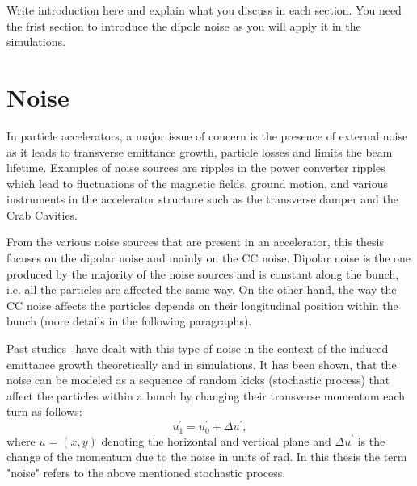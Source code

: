 Write introduction here and explain what you discuss in each section.
You need the frist section to introduce the dipole noise as you will apply it in the simulations.
\section{Noise}\label{sec:noise_definition}
In particle accelerators, a major issue of concern is the presence of external noise as it leads to transverse emittance growth, particle losses and limits the beam lifetime. Examples of noise sources are ripples in the power converter ripples which lead to fluctuations of the magnetic fields, ground motion, and various instruments in the accelerator structure such as the transverse damper and the Crab Cavities. %

From the various noise sources that are present in an accelerator, this thesis focuses on the dipolar noise and mainly on the CC noise. Dipolar noise is the one produced by the majority of the noise sources and is constant along the bunch, i.e. all the particles are affected the same way. %
On the other hand, the way the CC noise affects the particles depends on their longitudinal position within the bunch (more details in the following paragraphs).

Past studies~\cite{Lebedev:248620, Lebedev:248622, PhysRevSTAB.18.101001} have dealt with this type of noise in the context of the induced emittance growth theoretically and in simulations. It has been shown, that the noise can be modeled as a sequence of random kicks (stochastic process) that affect the particles within a bunch by changing their transverse momentum each turn as follows:
\begin{equation}\label{eq:external_noise_kicks}
    u^\prime_1 =  u^\prime_0 + \Delta u^\prime,
\end{equation}
where $u=(x,y)$ denoting the horizontal and vertical plane and $\Delta u^\prime$ is the change of the momentum due to the noise in units of rad. In this thesis the term "noise" refers to the above mentioned stochastic process.


